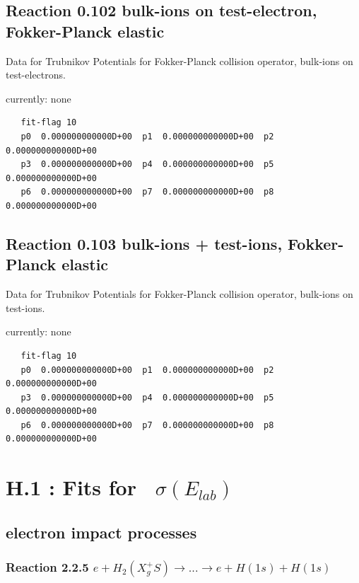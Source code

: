 \documentclass[12pt,dvips]{article}
\begin{document}
\subsection{
Reaction 0.102   bulk-ions on test-electron, Fokker-Planck elastic }
Data for Trubnikov Potentials for Fokker-Planck collision
operator, bulk-ions on test-electrons.


currently: none

\begin{small}\begin{verbatim}
   fit-flag 10
   p0  0.000000000000D+00  p1  0.000000000000D+00  p2  0.000000000000D+00
   p3  0.000000000000D+00  p4  0.000000000000D+00  p5  0.000000000000D+00
   p6  0.000000000000D+00  p7  0.000000000000D+00  p8  0.000000000000D+00
\end{verbatim}\end{small}

\subsection{
Reaction 0.103   bulk-ions + test-ions, Fokker-Planck elastic }
Data for Trubnikov Potentials for Fokker-Planck collision
operator, bulk-ions on test-ions.

currently: none

\begin{small}\begin{verbatim}
   fit-flag 10
   p0  0.000000000000D+00  p1  0.000000000000D+00  p2  0.000000000000D+00
   p3  0.000000000000D+00  p4  0.000000000000D+00  p5  0.000000000000D+00
   p6  0.000000000000D+00  p7  0.000000000000D+00  p8  0.000000000000D+00
\end{verbatim}\end{small}


\newpage

\section{H.1 :  Fits for  \    $\sigma(E_{lab})$}\label{sect1}


\subsection{electron impact processes}
\subsubsection{
Reaction 2.2.5
$ e + H_2 (X_g^+S) \rightarrow . . . \rightarrow e + H(1s) + H(1s) $ }
\end{document}
